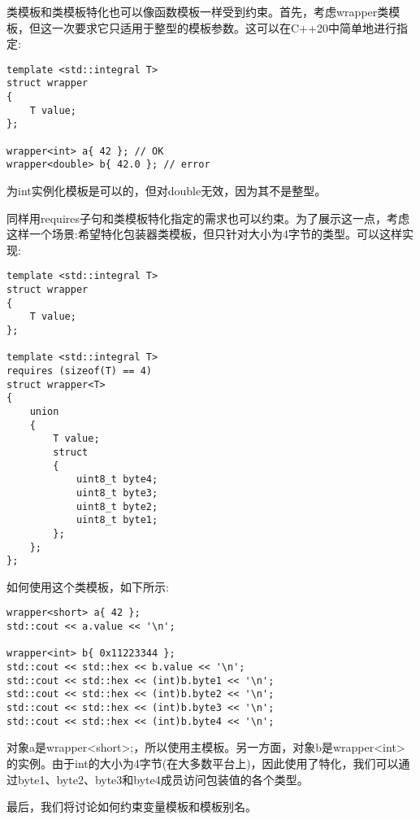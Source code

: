 类模板和类模板特化也可以像函数模板一样受到约束。首先，考虑wrapper类模板，但这一次要求它只适用于整型的模板参数。这可以在C++20中简单地进行指定:

\begin{lstlisting}[style=styleCXX]
template <std::integral T>
struct wrapper
{
	T value;
};

wrapper<int> a{ 42 }; // OK
wrapper<double> b{ 42.0 }; // error
\end{lstlisting}

为int实例化模板是可以的，但对double无效，因为其不是整型。

同样用requires子句和类模板特化指定的需求也可以约束。为了展示这一点，考虑这样一个场景:希望特化包装器类模板，但只针对大小为4字节的类型。可以这样实现:

\begin{lstlisting}[style=styleCXX]
template <std::integral T>
struct wrapper
{
	T value;
};

template <std::integral T>
requires (sizeof(T) == 4)
struct wrapper<T>
{
	union
	{
		T value;
		struct
		{
			uint8_t byte4;
			uint8_t byte3;
			uint8_t byte2;
			uint8_t byte1;
		};
	};
};
\end{lstlisting}

如何使用这个类模板，如下所示:

\begin{lstlisting}[style=styleCXX]
wrapper<short> a{ 42 };
std::cout << a.value << '\n';

wrapper<int> b{ 0x11223344 };
std::cout << std::hex << b.value << '\n';
std::cout << std::hex << (int)b.byte1 << '\n';
std::cout << std::hex << (int)b.byte2 << '\n';
std::cout << std::hex << (int)b.byte3 << '\n';
std::cout << std::hex << (int)b.byte4 << '\n';
\end{lstlisting}

对象a是wrapper<short>;，所以使用主模板。另一方面，对象b是wrapper<int>的实例。由于int的大小为4字节(在大多数平台上)，因此使用了特化，我们可以通过byte1、byte2、byte3和byte4成员访问包装值的各个类型。

最后，我们将讨论如何约束变量模板和模板别名。




































































